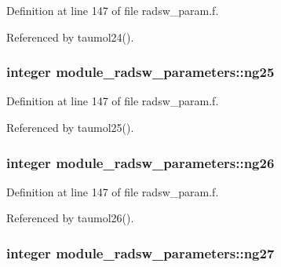 Definition at line 147 of file radsw\+\_\+param.\+f.



Referenced by taumol24().

\subsubsection[{\texorpdfstring{ng25}{ng25}}]{\setlength{\rightskip}{0pt plus 5cm}integer module\+\_\+radsw\+\_\+parameters\+::ng25}\hypertarget{namespacemodule__radsw__parameters_a3361783dd00dc40ee9f93c7f428c4e58}{}\label{namespacemodule__radsw__parameters_a3361783dd00dc40ee9f93c7f428c4e58}


Definition at line 147 of file radsw\+\_\+param.\+f.



Referenced by taumol25().

\subsubsection[{\texorpdfstring{ng26}{ng26}}]{\setlength{\rightskip}{0pt plus 5cm}integer module\+\_\+radsw\+\_\+parameters\+::ng26}\hypertarget{namespacemodule__radsw__parameters_afcc02ded0358f9465eb9987226522266}{}\label{namespacemodule__radsw__parameters_afcc02ded0358f9465eb9987226522266}


Definition at line 147 of file radsw\+\_\+param.\+f.



Referenced by taumol26().

\subsubsection[{\texorpdfstring{ng27}{ng27}}]{\setlength{\rightskip}{0pt plus 5cm}integer module\+\_\+radsw\+\_\+parameters\+::ng27}\hypertarget{namespacemodule__radsw__parameters_a56a6dfca4ad450a5ccc910864780a971}{}\label{namespacemodule__radsw__parameters_a56a6dfca4ad450a5ccc910864780a971}


